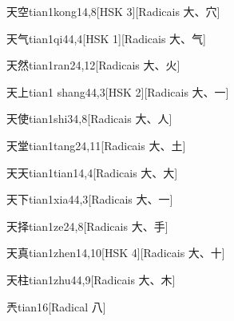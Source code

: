\begin{entry}{天空}{tian1kong1}{4,8}[HSK 3][Radicais ⼤、⽳]
\end{entry}

\begin{entry}{天气}{tian1qi4}{4,4}[HSK 1][Radicais ⼤、⽓]
\end{entry}

\begin{entry}{天然}{tian1ran2}{4,12}[Radicais ⼤、⽕]
\end{entry}

\begin{entry}{天上}{tian1 shang4}{4,3}[HSK 2][Radicais ⼤、⼀]
\end{entry}

\begin{entry}{天使}{tian1shi3}{4,8}[Radicais ⼤、⼈]
\end{entry}

\begin{entry}{天堂}{tian1tang2}{4,11}[Radicais ⼤、⼟]
\end{entry}

\begin{entry}{天天}{tian1tian1}{4,4}[Radicais ⼤、⼤]
\end{entry}

\begin{entry}{天下}{tian1xia4}{4,3}[Radicais ⼤、⼀]
\end{entry}

\begin{entry}{天择}{tian1ze2}{4,8}[Radicais ⼤、⼿]
\end{entry}

\begin{entry}{天真}{tian1zhen1}{4,10}[HSK 4][Radicais ⼤、⼗]
\end{entry}

\begin{entry}{天柱}{tian1zhu4}{4,9}[Radicais ⼤、⽊]
\end{entry}

\begin{entry}{兲}{tian1}{6}[Radical ⼋]
\end{entry}

